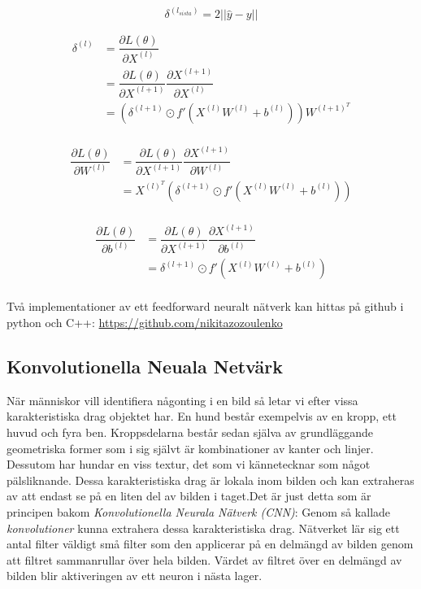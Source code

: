 \documentclass[a4paper,11pt,twoside]{article}
\newcommand*{\pd}[2]{\ensuremath{\dfrac{\partial #1}{\partial #2}}}
\begin{document}
\begin{equation}
\delta^{(l_{sista})} = 2 ||\hat{y}-y||
\end{equation}

\begin{equation}
\begin{split}
\delta^{(l)} 
	& = \pd{L(\theta)}{X^{(l)}} \\
	& = \pd{L(\theta)}{X^{(l+1)}} \pd{X^{(l+1)}}{X^{(l)}}\\
	& = \left( \delta^{(l+1)} \odot f'(X^{(l)}W^{(l)}+b^{(l)}) \right) W^{(l+1)^T}\\
\end{split}
\end{equation}

\begin{equation}
\begin{split}
\pd{L(\theta)}{W^{(l)}}
	& = \pd{L(\theta)}{X^{(l+1)}} \pd{X^{(l+1)}}{W^{(l)}}\\
	& = X^{(l)^T} \left( \delta^{(l+1)} \odot f'(X^{(l)} W^{(l)}+b^{(l)}) \right) \\
\end{split}
\end{equation}

\begin{equation}
\begin{split}
\pd{L(\theta)}{b^{(l)}}
	& = \pd{L(\theta)}{X^{(l+1)}} \pd{X^{(l+1)}}{b^{(l)}}\\
	& =  \delta^{(l+1)} \odot f'(X^{(l)} W^{(l)}+b^{(l)})  \\
\end{split}
\end{equation}

Två implementationer av ett feedforward neuralt nätverk kan hittas på github i python och C++: \url{https://github.com/nikitazozoulenko}

\subsection{Konvolutionella Neuala Netvärk}
När människor vill identifiera någonting i en bild så letar vi efter vissa karakteristiska drag objektet har. En hund består exempelvis av en kropp, ett huvud och fyra ben. Kroppsdelarna består sedan själva av grundläggande geometriska former som i sig självt är kombinationer av kanter och linjer. Dessutom har hundar en viss textur, det som vi kännetecknar som något pälsliknande. Dessa karakteristiska drag är lokala inom bilden och kan extraheras av att endast se på en liten del av bilden i taget.Det är just detta som är principen bakom \textit{Konvolutionella Neurala Nätverk (CNN)}: Genom så kallade \textit{konvolutioner} kunna extrahera dessa karakteristiska drag. Nätverket lär sig ett antal filter väldigt små filter som den applicerar på en delmängd av bilden genom att filtret sammanrullar över hela bilden. Värdet av filtret över en delmängd av bilden blir aktiveringen av ett neuron i nästa lager.  \cite{cs231n}
\end{document}
